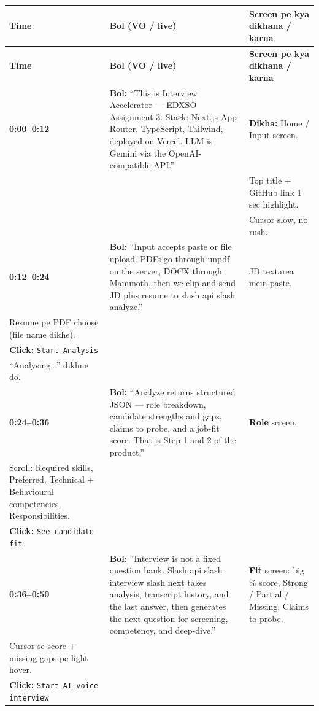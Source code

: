 \documentclass[11pt,a4paper]{article}
\newcommand{\sayline}[1]{\textbf{Bol:} ``#1''}
\newcommand{\dikha}[1]{\textbf{Dikha:} #1}
\newcommand{\click}[1]{\textbf{Click:} \texttt{#1}}
\begin{document}
\renewcommand{\arraystretch}{1.35}
\begin{longtable}{@{}>{\raggedright\arraybackslash}p{1.5cm}>{\raggedright\arraybackslash}p{6.6cm}>{\raggedright\arraybackslash}p{6.2cm}@{}}
\toprule
\textbf{Time} & \textbf{Bol (VO / live)} & \textbf{Screen pe kya dikhana / karna} \\
\midrule
\endfirsthead
\toprule
\textbf{Time} & \textbf{Bol (VO / live)} & \textbf{Screen pe kya dikhana / karna} \\
\midrule
\endhead

\textbf{0:00--0:12}
&
\sayline{This is Interview Accelerator --- EDXSO Assignment 3. Stack: Next.js App Router, TypeScript, Tailwind, deployed on Vercel. LLM is Gemini via the OpenAI-compatible API.}
&
\dikha{Home / Input screen.}\\
& & Top title + GitHub link 1 sec highlight.\\
& & Cursor slow, no rush.\\
\midrule

\textbf{0:12--0:24}
&
\sayline{Input accepts paste or file upload. PDFs go through unpdf on the server, DOCX through Mammoth, then we clip and send JD plus resume to slash api slash analyze.}
&
JD textarea mein paste.\\
Resume pe PDF choose (file name dikhe).\\
\click{Start Analysis}\\
``Analysing\ldots'' dikhne do.\\
\midrule

\textbf{0:24--0:36}
&
\sayline{Analyze returns structured JSON --- role breakdown, candidate strengths and gaps, claims to probe, and a job-fit score. That is Step 1 and 2 of the product.}
&
\textbf{Role} screen.\\
Scroll: Required skills, Preferred, Technical + Behavioural competencies, Responsibilities.\\
\click{See candidate fit}\\
\midrule

\textbf{0:36--0:50}
&
\sayline{Interview is not a fixed question bank. Slash api slash interview slash next takes analysis, transcript history, and the last answer, then generates the next question for screening, competency, and deep-dive.}
&
\textbf{Fit} screen: big \% score, Strong / Partial / Missing, Claims to probe.\\
Cursor se score + missing gaps pe light hover.\\
\click{Start AI voice interview}\\
\midrule


\end{longtable}
\end{document}
